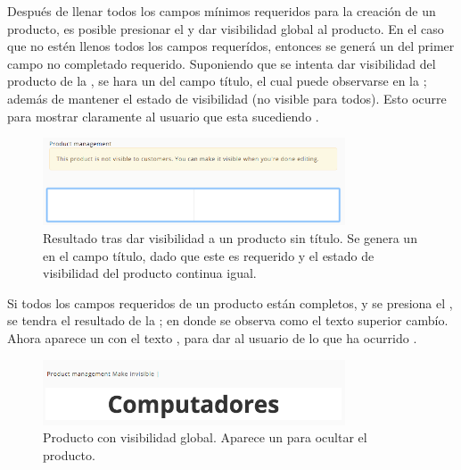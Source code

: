 		Después de llenar todos los campos mínimos requeridos para la creación de un producto, es posible presionar el \linkINT \youCanMakeItVisibleLABEL y dar visibilidad global al producto. En el caso que no estén llenos todos los campos requerídos, entonces se generá un \autoFocoINT del primer campo no completado requerido. Suponiendo que se intenta dar visibilidad del producto de la , se hara un \autoFocoINT del campo título, el cual puede observarse en la ; además de mantener el estado de visibilidad (no visible para todos). Esto ocurre para mostrar claramente al usuario que esta sucediendo \cite{online_google_ui_pattern_error,online_goodgui_org}.

		\begin{figure}[H]
			\centering
			\includegraphics[width=0.8\textwidth]{figuras/solution/product/visibility/autofocus.png}

			\caption{Resultado tras dar visibilidad a un producto sin título. Se genera un \autoFocoINT en el campo título, dado que este es requerido y el estado de visibilidad del producto continua igual.}
			\label{figure:solution:product:visibility:autofocus}
		\end{figure}

		Si todos los campos requeridos de un producto están completos, y se presiona el \linkINT \youCanMakeItVisibleLABEL, se tendra el resultado de la ; en donde se observa como el texto superior cambío. Ahora aparece un \linkINT con el texto \makeInvisibleLABEL, para dar \feedback al usuario de lo que ha ocurrido \cite{online_google_ui_design_material,online_goodgui_org}.

		\begin{figure}[H]
			\centering
			\includegraphics[width=0.8\textwidth]{figuras/solution/product/visibility/global_visibility.png}

			\caption{Producto con visibilidad global. Aparece un \linkINT \makeInvisibleLABEL para ocultar el producto.}
			\label{figure:solution:product:visibility:global_visibility}
		\end{figure}

